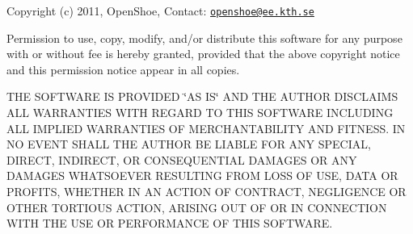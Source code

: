 \-Copyright (c) 2011, \-Open\-Shoe, \-Contact\-: \href{mailto:openshoe@ee.kth.se}{\tt openshoe@ee.\-kth.\-se}

\-Permission to use, copy, modify, and/or distribute this software for any purpose with or without fee is hereby granted, provided that the above copyright notice and this permission notice appear in all copies.

\-T\-H\-E \-S\-O\-F\-T\-W\-A\-R\-E \-I\-S \-P\-R\-O\-V\-I\-D\-E\-D \char`\"{}\-A\-S I\-S\char`\"{} \-A\-N\-D \-T\-H\-E \-A\-U\-T\-H\-O\-R \-D\-I\-S\-C\-L\-A\-I\-M\-S \-A\-L\-L \-W\-A\-R\-R\-A\-N\-T\-I\-E\-S \-W\-I\-T\-H \-R\-E\-G\-A\-R\-D \-T\-O \-T\-H\-I\-S \-S\-O\-F\-T\-W\-A\-R\-E \-I\-N\-C\-L\-U\-D\-I\-N\-G \-A\-L\-L \-I\-M\-P\-L\-I\-E\-D \-W\-A\-R\-R\-A\-N\-T\-I\-E\-S \-O\-F \-M\-E\-R\-C\-H\-A\-N\-T\-A\-B\-I\-L\-I\-T\-Y \-A\-N\-D \-F\-I\-T\-N\-E\-S\-S. \-I\-N \-N\-O \-E\-V\-E\-N\-T \-S\-H\-A\-L\-L \-T\-H\-E \-A\-U\-T\-H\-O\-R \-B\-E \-L\-I\-A\-B\-L\-E \-F\-O\-R \-A\-N\-Y \-S\-P\-E\-C\-I\-A\-L, \-D\-I\-R\-E\-C\-T, \-I\-N\-D\-I\-R\-E\-C\-T, \-O\-R \-C\-O\-N\-S\-E\-Q\-U\-E\-N\-T\-I\-A\-L \-D\-A\-M\-A\-G\-E\-S \-O\-R \-A\-N\-Y \-D\-A\-M\-A\-G\-E\-S \-W\-H\-A\-T\-S\-O\-E\-V\-E\-R \-R\-E\-S\-U\-L\-T\-I\-N\-G \-F\-R\-O\-M \-L\-O\-S\-S \-O\-F \-U\-S\-E, \-D\-A\-T\-A \-O\-R \-P\-R\-O\-F\-I\-T\-S, \-W\-H\-E\-T\-H\-E\-R \-I\-N \-A\-N \-A\-C\-T\-I\-O\-N \-O\-F \-C\-O\-N\-T\-R\-A\-C\-T, \-N\-E\-G\-L\-I\-G\-E\-N\-C\-E \-O\-R \-O\-T\-H\-E\-R \-T\-O\-R\-T\-I\-O\-U\-S \-A\-C\-T\-I\-O\-N, \-A\-R\-I\-S\-I\-N\-G \-O\-U\-T \-O\-F \-O\-R \-I\-N \-C\-O\-N\-N\-E\-C\-T\-I\-O\-N \-W\-I\-T\-H \-T\-H\-E \-U\-S\-E \-O\-R \-P\-E\-R\-F\-O\-R\-M\-A\-N\-C\-E \-O\-F \-T\-H\-I\-S \-S\-O\-F\-T\-W\-A\-R\-E. 